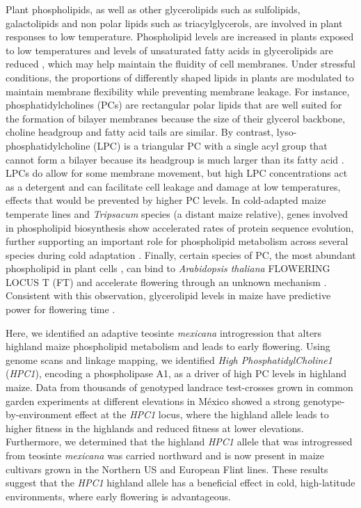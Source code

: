 \documentclass[9pt,twocolumn,twoside,lineno]{biorxiv}
\begin{document}
Plant phospholipids, as well as other glycerolipids such as sulfolipids, galactolipids and non polar lipids such as triacylglycerols, are involved in plant responses to low temperature.
Phospholipid levels are increased in plants exposed to low temperatures \cite{Degenkolbe2012-wf} and levels of unsaturated fatty acids in glycerolipids are reduced \cite{Welti2002-uk, Lynch1987-ln}, which may help maintain the fluidity of cell membranes.
Under stressful conditions, the proportions of differently shaped lipids in plants are modulated to maintain membrane flexibility while preventing membrane leakage. 
For instance, phosphatidylcholines (PCs) are rectangular polar lipids that are well suited for the formation of bilayer membranes because the size of their glycerol backbone, choline headgroup and fatty acid tails are similar.
By contrast, lyso-phosphatidylcholine (LPC) is a triangular PC with a single acyl group that cannot form a bilayer because its headgroup is much larger than its fatty acid \cite{Jouhet2013-fv}.
LPCs do allow for some membrane movement, but high LPC concentrations act as a detergent \cite{Henriksen2010-cm} and can facilitate cell leakage and damage at low temperatures, effects that would be prevented by higher PC levels.
In cold-adapted maize temperate lines and \textit{Tripsacum} species (a distant maize relative), genes involved in  phospholipid biosynthesis show accelerated rates of protein sequence evolution, further supporting an important role for phospholipid metabolism across several species during cold adaptation \cite{Yan2019-tx}. 
Finally, certain species of PC, the most abundant phospholipid  in plant cells \cite{Gu2017-nd}, can bind to \textit{Arabidopsis thaliana} FLOWERING LOCUS T (FT) and accelerate flowering through an unknown mechanism \cite{Nakamura2014-qf}. 
Consistent with this observation, glycerolipid levels in maize have predictive power for flowering time \cite{Riedelsheimer2013-bd}. 

Here, we identified an adaptive teosinte \textit{mexicana} introgression that alters highland maize phospholipid metabolism and leads to early flowering.
Using genome scans and linkage mapping, we identified \textit{High PhosphatidylCholine1} (\textit{HPC1}), encoding a phospholipase A1, as a driver of high PC levels in highland maize. 
Data from thousands of genotyped landrace test-crosses grown in common garden experiments at different elevations in México showed a strong genotype-by-environment effect at the \textit{HPC1} locus, where the highland allele leads to higher fitness in the highlands and reduced fitness at lower elevations.
Furthermore, we determined that the highland \textit{HPC1} allele that was introgressed from teosinte \textit{mexicana} was carried northward and is now present in maize cultivars grown in the Northern US and European Flint lines.
These results suggest that the \textit{HPC1} highland allele has a beneficial effect in cold, high-latitude environments, where early flowering is advantageous.
\end{document}
